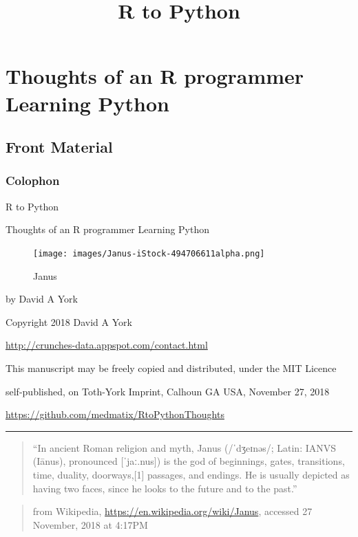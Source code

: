 \documentclass[]{book}
\title{R to Python}
\author{}
\date{}
\theoremstyle{definition}
\theoremstyle{definition}
\theoremstyle{definition}
\theoremstyle{remark}
\begin{document}
\maketitle

{
\setcounter{tocdepth}{1}
\tableofcontents
}
\part{Thoughts of an R programmer Learning
Python}\label{part-thoughts-of-an-r-programmer-learning-python}

\chapter{Front Material}\label{front-material}

\section{Colophon}\label{colophon}

R to Python

Thoughts of an R programmer Learning Python

\begin{figure}
\centering
\texttt{[image: images/Janus-iStock-494706611alpha.png]}
\caption{Janus}
\end{figure}

by David A York

Copyright 2018 David A York

\url{http://crunches-data.appspot.com/contact.html}

This manuscript may be freely copied and distributed, under the MIT
Licence

self-published, on Toth-York Imprint, Calhoun GA USA, November 27, 2018

\url{https://github.com/medmatix/RtoPythonThoughts}

\begin{center}\rule{0.5\linewidth}{\linethickness}\end{center}

\begin{quote}
``In ancient Roman religion and myth, Janus (/ˈdʒeɪnəs/; Latin: IANVS
(Iānus), pronounced {[}ˈjaː.nus{]}) is the god of beginnings, gates,
transitions, time, duality, doorways,{[}1{]} passages, and endings. He
is usually depicted as having two faces, since he looks to the future
and to the past.''
\end{quote}

\begin{quote}
from Wikipedia, \url{https://en.wikipedia.org/wiki/Janus}, accessed 27
November, 2018 at 4:17PM
\end{quote}
\end{document}
